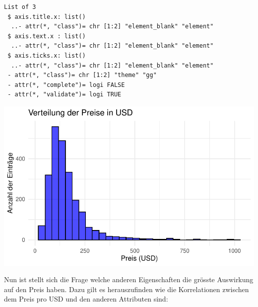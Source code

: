 \documentclass[
  journal,
]{IEEEtran}%
\begin{document}
\begin{verbatim}
List of 3
 $ axis.title.x: list()
  ..- attr(*, "class")= chr [1:2] "element_blank" "element"
 $ axis.text.x : list()
  ..- attr(*, "class")= chr [1:2] "element_blank" "element"
 $ axis.ticks.x: list()
  ..- attr(*, "class")= chr [1:2] "element_blank" "element"
 - attr(*, "class")= chr [1:2] "theme" "gg"
 - attr(*, "complete")= logi FALSE
 - attr(*, "validate")= logi TRUE
\end{verbatim}

\includegraphics{main_files/figure-pdf/unnamed-chunk-6-2.pdf}

Nun ist stellt sich die Frage welche anderen Eigenschaften die grösste
Auswirkung auf den Preis haben. Dazu gilt es herauszufinden wie die
Korrelationen zwischen dem Preis pro USD und den anderen Attributen
sind:
\end{document}
